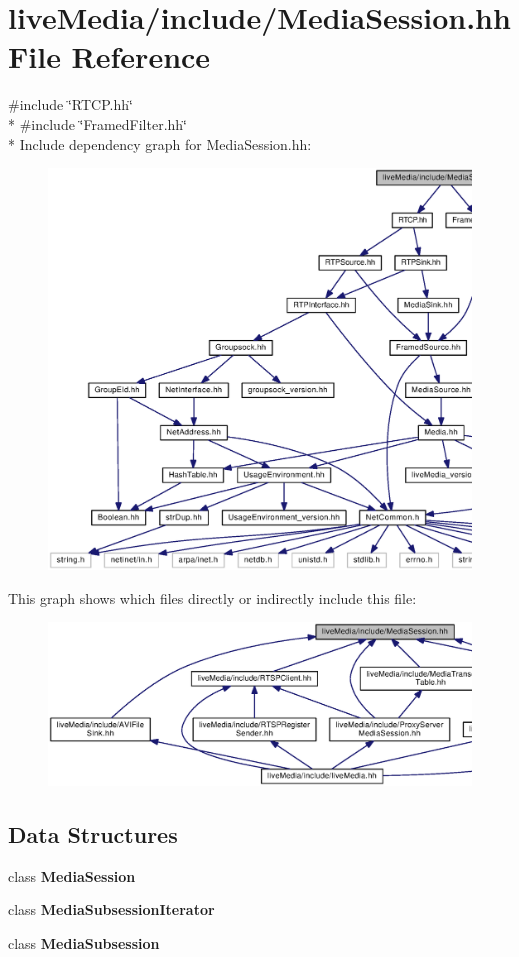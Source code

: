 \section{live\+Media/include/\+Media\+Session.hh File Reference}
\label{MediaSession_8hh}
{\ttfamily \#include \char`\"{}R\+T\+C\+P.\+hh\char`\"{}}\\*
{\ttfamily \#include \char`\"{}Framed\+Filter.\+hh\char`\"{}}\\*
Include dependency graph for Media\+Session.\+hh\+:
\nopagebreak
\begin{figure}[H]
\begin{center}
\leavevmode
\includegraphics[width=350pt]{MediaSession_8hh__incl}
\end{center}
\end{figure}
This graph shows which files directly or indirectly include this file\+:
\nopagebreak
\begin{figure}[H]
\begin{center}
\leavevmode
\includegraphics[width=350pt]{MediaSession_8hh__dep__incl}
\end{center}
\end{figure}
\subsection*{Data Structures}
\begin{DoxyCompactItemize}
\item 
class {\bf Media\+Session}
\item 
class {\bf Media\+Subsession\+Iterator}
\item 
class {\bf Media\+Subsession}
\end{DoxyCompactItemize}
